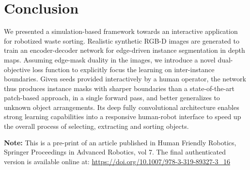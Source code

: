 \documentclass[runningheads,a4paper]{llncs}
\begin{document}
\section{Conclusion}

We presented a simulation-based framework towards an interactive application for robotized waste sorting. Realistic synthetic RGB-D images are generated to train an encoder-decoder network for edge-driven instance segmentation in depth maps. Assuming edge-mask duality in the images, we introduce a novel dual-objective loss function to explicitly focus the learning on inter-instance boundaries. Given seeds provided interactively by a human operator, the network thus produces instance masks with sharper boundaries than a state-of-the-art patch-based approach, in a single forward pass, and better generalizes to unknown object arrangements. Its deep fully convolutional architecture enables strong learning capabilities into a responsive human-robot interface to speed up the overall process of selecting, extracting and sorting objects.

\bigskip

\textbf{Note:} This is a pre-print of an article published in Human Friendly Robotics, Springer Proceedings in Advanced Robotics, vol 7. The final authenticated version is available online at: \url{https://doi.org/10.1007/978-3-319-89327-3_16}




\end{document}
